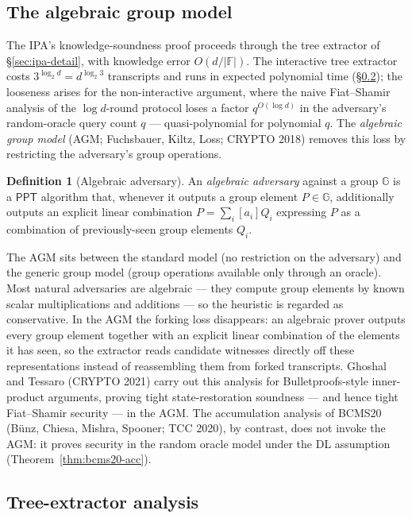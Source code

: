 \documentclass[11pt,a4paper]{article}
\theoremstyle{definition}
\newtheorem{definition}[theorem]{Definition}
\newcommand{\F}{\mathbb{F}}
\newcommand{\G}{\mathbb{G}}
\newcommand{\PPT}{\mathsf{PPT}}
\begin{document}
\subsection{The algebraic group model}

The IPA's knowledge-soundness proof proceeds through the tree extractor of
\S\ref{sec:ipa-detail}, with knowledge error $O(d / |\F|)$. The
interactive tree extractor costs $3^{\log_2 d} = d^{\log_2 3}$
transcripts and runs in expected polynomial time
(\S\ref{sec:tree-extract}); the looseness arises for the non-interactive
argument, where the naive Fiat--Shamir analysis of the $\log d$-round
protocol loses a factor $q^{O(\log d)}$ in the adversary's random-oracle
query count $q$ --- quasi-polynomial for polynomial $q$.
The \emph{algebraic group model} (AGM; Fuchsbauer, Kiltz, Loss; CRYPTO
2018) removes this loss by restricting the adversary's group operations.

\begin{definition}[Algebraic adversary]\label{def:algebraic}
An \emph{algebraic adversary} against a group $\G$ is a $\PPT$ algorithm
that, whenever it outputs a group element $P \in \G$, additionally outputs
an explicit linear combination
$P = \sum_i [a_i] Q_i$ expressing $P$ as a combination of previously-seen
group elements $Q_i$.
\end{definition}

The AGM sits between the standard model (no restriction on the adversary)
and the generic group model (group operations available only through an
oracle). Most natural adversaries are algebraic --- they compute group
elements by known scalar multiplications and additions --- so the
heuristic is regarded as conservative. In the AGM the forking loss
disappears: an algebraic prover outputs every group element together with
an explicit linear combination of the elements it has seen, so the
extractor reads candidate witnesses directly off these representations
instead of reassembling them from forked transcripts. Ghoshal and Tessaro
(CRYPTO 2021) carry out this analysis for Bulletproofs-style
inner-product arguments, proving tight state-restoration soundness ---
and hence tight Fiat--Shamir security --- in the AGM. The accumulation
analysis of BCMS20 (B\"unz, Chiesa, Mishra, Spooner; TCC 2020), by
contrast, does not invoke the AGM: it proves
security in the random oracle model under the DL assumption
(Theorem~\ref{thm:bcms20-acc}).

\subsection{Tree-extractor analysis}\label{sec:tree-extract}
\end{document}
